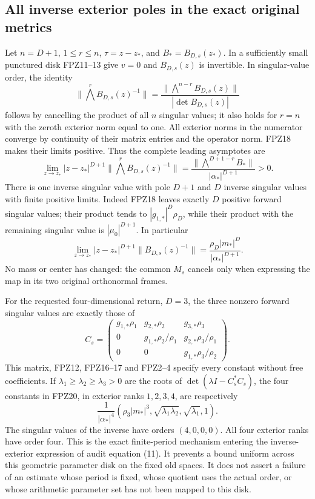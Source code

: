\documentclass[11pt]{article}
\begin{document}
\subsection{All inverse exterior poles in the exact original metrics}
Let $n=D+1$, $1\le r\le n$, $\tau=z-z_*$, and
$B_*=B_{D,s}(z_*)$. In a sufficiently small punctured disk FPZ11--13
give $v=0$ and $B_{D,s}(z)$ is invertible. In singular-value order,
the identity
\[
 \|\bigwedge^r B_{D,s}(z)^{-1}\|
 =\frac{\|\bigwedge^{n-r}B_{D,s}(z)\|}
 {|\det B_{D,s}(z)|}
 \tag{FPZ19}
\]
follows by cancelling the product of all $n$ singular values; it also
holds for $r=n$ with the zeroth exterior norm equal to one.
All exterior norms in the numerator converge by continuity of their
matrix entries and the operator norm. FPZ18 makes their limits positive.
Thus the complete leading asymptotes are
\[
 \boxed{\displaystyle
 \lim_{z\to z_*}|z-z_*|^{D+1}
 \|\bigwedge^r B_{D,s}(z)^{-1}\|
 =\frac{\|\bigwedge^{D+1-r}B_*\|}{|\alpha_*|^{D+1}}>0.}
 \tag{FPZ20}
\]
There is one inverse singular value with pole $D+1$ and $D$ inverse
singular values with finite positive limits. Indeed FPZ18 leaves exactly
$D$ positive forward singular values; their product tends to
$|g_{1,*}|^D\rho_D$, while their product with the remaining singular
value is $|\mu_0|^{D+1}$. In particular
\[
 \lim_{z\to z_*}|z-z_*|^{D+1}\|B_{D,s}(z)^{-1}\|
 =\frac{\rho_D|m_*|^D}{|\alpha_*|^{D+1}}.
 \tag{FPZ21}
\]
No mass or center has changed: the common $M_s$ cancels only when
expressing the map in its two original orthonormal frames.

For the requested four-dimensional return, $D=3$, the three nonzero
forward singular values are exactly those of
\[
 C_s=\begin{pmatrix}
 g_{1,*}\rho_1&g_{2,*}\rho_2&g_{3,*}\rho_3\\
 0&g_{1,*}\rho_2/\rho_1&g_{2,*}\rho_3/\rho_1\\
 0&0&g_{1,*}\rho_3/\rho_2
 \end{pmatrix}.
 \tag{FPZ22}
\]
This matrix, FPZ12, FPZ16--17 and FPZ2--4 specify every constant
without free coefficients. If $\lambda_1\ge\lambda_2\ge\lambda_3>0$
are the roots of $\det(\lambda I-C_s^*C_s)$, the four constants in
FPZ20, in exterior ranks $1,2,3,4$, are respectively
\[
 \frac1{|\alpha_*|^4}
 \left(\rho_3|m_*|^3,\sqrt{\lambda_1\lambda_2},
                           \sqrt{\lambda_1},1\right).
 \tag{FPZ23}
\]
The singular values of the inverse have orders $(4,0,0,0)$.
All four exterior ranks have order four. This is the exact finite-period
mechanism entering the inverse-exterior expression of audit equation
(11). It prevents a bound uniform across this geometric parameter
disk on the fixed old spaces. It does not assert a failure of an estimate
whose period is fixed, whose quotient uses the actual order, or whose
arithmetic parameter set has not been mapped to this disk.
\end{document}
